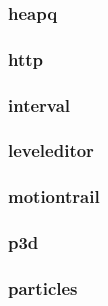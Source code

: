 \documentclass[a4paper]{article}
\begin{document}
\clearpage\subsubsection[heapq]{heapq}
\hypertarget{RefHeading18071167907073}{}\subsubsection{}
\clearpage\subsubsection[http]{http}
\hypertarget{RefHeading18091167907073}{}\subsubsection{}
\clearpage\subsubsection[interval]{interval}
\hypertarget{RefHeading18111167907073}{}\subsubsection{}
\clearpage\subsubsection[leveleditor]{leveleditor}
\hypertarget{RefHeading18131167907073}{}\subsubsection{}
\clearpage\subsubsection[motiontrail]{motiontrail}
\hypertarget{RefHeading18151167907073}{}\subsubsection{}
\clearpage\subsubsection[p3d]{p3d}
\hypertarget{RefHeading18171167907073}{}\subsubsection{}
\clearpage\subsubsection[particles]{particles}
\end{document}
